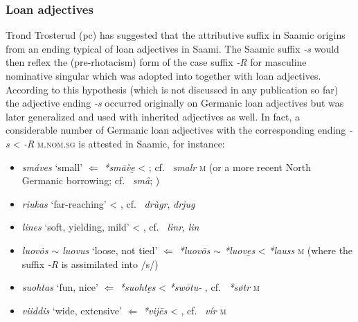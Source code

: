 {\subsubsection{Loan adjectives} 
Trond Trosterud (pc) has suggested that the attributive suffix in Saamic origins from an ending typical of  loan adjectives in Saami. The Saamic suffix \textit{-s} would then reflex the (pre-rhotacism) form of the  case suffix \textit{-R} for masculine nominative singular which was adopted into  together with loan adjectives. According to this hypothesis (which is not discussed in any publication so far) the adjective ending \mbox{\textit{-s}} occurred originally on Germanic loan adjectives but was later generalized and used with inherited adjectives as well. In fact, a considerable number of Germanic loan adjectives with the corresponding ending \textit{-s} <  \textit{-R} \textsc{m.nom.sg} is attested in Saamic, for instance:
\begin{itemize}
\item {} \textit{smáves} ‘small’ $\Leftarrow$  \textit{*smāv̀e̮} < ; cf.~ \textit{smalr} \textsc{m} (or a more recent North Germanic borrowing; cf.~ \textit{sm\aa}; \citealt[263]{sammallahti1998b})
\item {} \textit{riukas} ‘far-reaching’ < , cf.~ \textit{drùgr},  \textit{drjug} \cite[267]{qvigstad1893}
\item {} \textit{lines} ‘soft, yielding, mild’ < , cf.~ \textit{linr},  \textit{lin} \cite[218]{qvigstad1893}
\item {} \textit{luov\.{o}s $\sim$ luovus} ‘loose, not tied’ $\Leftarrow$  \textit{*luovōs $\sim$ *luove̮s} <  \textit{*lauss} \textsc{m} (where the suffix \textit{-R} is assimilated into /s/) \cite[264]{sammallahti1998b}
\item {} \textit{suohtas} ‘fun, nice’ $\Leftarrow$  \textit{*suohte̮s} <  \textit{*swōtu-} \cite[264]{sammallahti1998b}, cf.~ \textit{*søtr} \textsc{m} 
\item {} \textit{viiddis} ‘wide, extensive’ $\Leftarrow$  \textit{*vij{\dh}ēs} <  \cite[148–149]{lehtiranta1989}, cf.~ \textit{v\'i{\dh}r} \textsc{m}

\end{itemize}}
